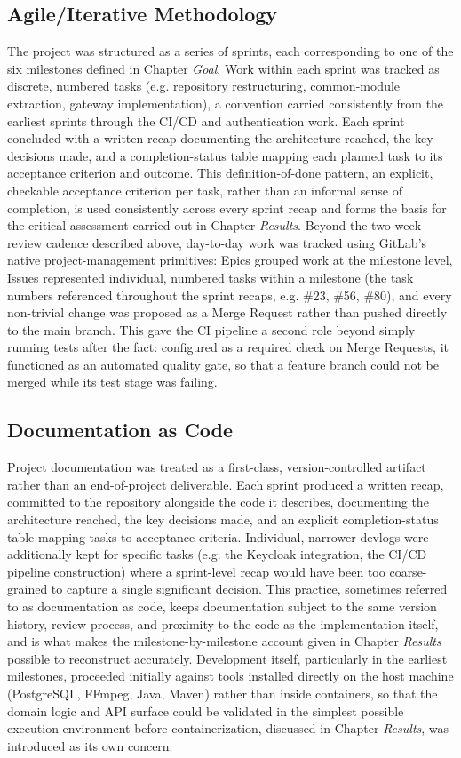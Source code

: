 \documentclass[twoside]{supsistudent}
\begin{document}
\subsection{Agile/Iterative Methodology}
The project was structured as a series of sprints, each corresponding to one of the six milestones defined in Chapter \emph{Goal}. Work within each sprint was tracked as discrete, numbered tasks (e.g. repository restructuring, common-module extraction, gateway implementation), a convention carried consistently from the earliest sprints through the CI/CD and authentication work. Each sprint concluded with a written recap documenting the architecture reached, the key decisions made, and a completion-status table mapping each planned task to its acceptance criterion and outcome. This definition-of-done pattern, an explicit, checkable acceptance criterion per task, rather than an informal sense of completion, is used consistently across every sprint recap and forms the basis for the critical assessment carried out in Chapter \emph{Results}.
Beyond the two-week review cadence described above, day-to-day work was tracked using GitLab's native project-management primitives: Epics grouped work at the milestone level, Issues represented individual, numbered tasks within a milestone (the task numbers referenced throughout the sprint recaps, e.g. \#23, \#56, \#80), and every non-trivial change was proposed as a Merge Request rather than pushed directly to the main branch. This gave the CI pipeline a second role beyond simply running tests after the fact: configured as a required check on Merge Requests, it functioned as an automated quality gate, so that a feature branch could not be merged while its test stage was failing.

\subsection{Documentation as Code}
Project documentation was treated as a first-class, version-controlled artifact rather than an end-of-project deliverable. Each sprint produced a written recap, committed to the repository alongside the code it describes, documenting the architecture reached, the key decisions made, and an explicit completion-status table mapping tasks to acceptance criteria. Individual, narrower devlogs were additionally kept for specific tasks (e.g. the Keycloak integration, the CI/CD pipeline construction) where a sprint-level recap would have been too coarse-grained to capture a single significant decision. This practice, sometimes referred to as documentation as code, keeps documentation subject to the same version history, review process, and proximity to the code as the implementation itself, and is what makes the milestone-by-milestone account given in Chapter \emph{Results} possible to reconstruct accurately. Development itself, particularly in the earliest milestones, proceeded initially against tools installed directly on the host machine (PostgreSQL, FFmpeg, Java, Maven) rather than inside containers, so that the domain logic and API surface could be validated in the simplest possible execution environment before containerization, discussed in Chapter \emph{Results}, was introduced as its own concern.
\end{document}
